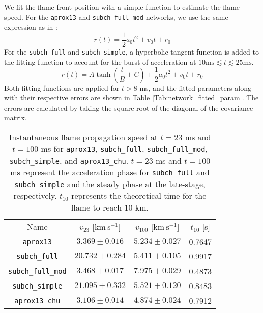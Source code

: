 \documentclass[preprint,times,tighten]{aastex631}
\begin{document}
We fit the flame front position with a simple function to estimate
the flame speed.  For the {\tt aprox13} and {\tt subch\_full\_mod} networks, we use the same expression
as in \citet{eiden:2020}:
\begin{equation}\label{Eq:quadratic_fit}
    r(t) = \frac{1}{2}a_0 t^2 + v_0 t + r_0
\end{equation}
For the {\tt subch\_full} and {\tt subch\_simple}, a hyperbolic tangent function is added to the fitting function to account for the burst of acceleration at $10 \mbox{ms} \lesssim t \lesssim 25 \mbox{ms}$.
\begin{equation}\label{Eq:tanh_fit}
    r(t) = A\tanh{\left(\frac{t}{B} + C\right)} + \frac{1}{2}a_0 t^2 + v_0 t + r_0
\end{equation}
Both fitting functions are applied for $t > 8$ ms, and the fitted parameters along with their respective errors are shown in Table \ref{Tab:network_fitted_param}. The errors are calculated by taking the square root of the diagonal of the covariance matrix. 


\begin{table*}
\caption{\label{Tab:network_instan_vel}
Instantaneous flame propagation speed at $t = 23$ ms and $t = 100$ ms for {\tt aprox13}, {\tt subch\_full}, {\tt subch\_full\_mod}, {\tt subch\_simple}, and {\tt aprox13\_chu}. $t = 23$ ms and $t=100$ ms represent the acceleration phase for {\tt subch\_full} and {\tt subch\_simple} and the steady phase at the late-stage, respectively. $t_{10}$ represents the theoretical time for the flame to reach 10 km.
}

\begin{ruledtabular}
\footnotesize
\centering
\begin{tabular}{cccc}
\small 
Name &
$v_{23}$ [$\mbox{km} \ \mbox{s}^{-1}$] &
$v_{100}$ [$\mbox{km} \ \mbox{s}^{-1}$] &
$t_{10}$ [s]
\\
\colrule

{\tt aprox13} & $3.369 \pm 0.016$ & $5.234 \pm 0.027$ & 0.7647 \\
{\tt subch\_full} & $20.732 \pm 0.284$ & $5.411 \pm 0.105$ & 0.9917 \\
{\tt subch\_full\_mod} & $3.468 \pm 0.017$ & $7.975 \pm 0.029$ & 0.4873 \\
{\tt subch\_simple} & $21.095 \pm 0.332$ & $5.521 \pm 0.120$ & 0.8483 \\
{\tt aprox13\_chu} & $3.106 \pm 0.014$ & $4.874 \pm 0.024$ & 0.7912 \\
\end{tabular}
\end{ruledtabular}
\end{table*}
\end{document}
